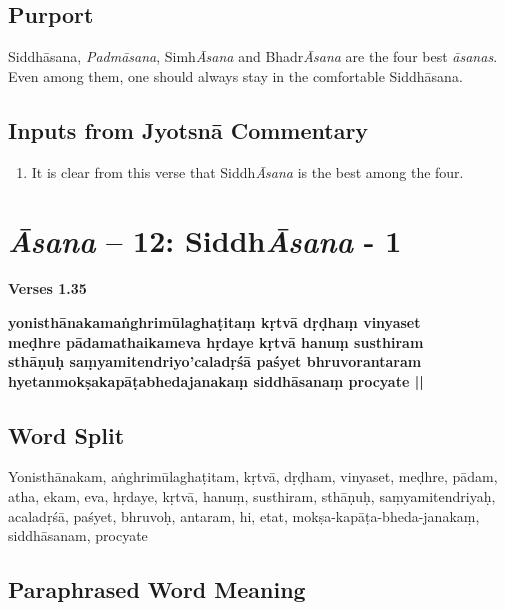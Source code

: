 \subsection*{Purport}

Siddhāsana, \textit{Padmāsana}, Simh\textit{Āsana} and Bhadr\textit{Āsana} are the four best \textit{āsanas}. Even among them, one should always stay in the comfortable Siddhāsana.

\subsection*{Inputs from Jyotsnā Commentary}

\begin{enumerate}
\item It is clear from this verse that Siddh\textit{Āsana} is the best among the four. 
\end{enumerate}

\section*{\textit{Āsana} -- 12: Siddh\textit{Āsana} - 1}

\noindent 
\textbf{Verses 1.35}

\begin{shloka}
\textbf{yonisthānakamaṅghrimūlaghaṭitaṃ kṛtvā dṛḍhaṃ vinyaset}\\
\textbf{meḍhre pādamathaikameva hṛdaye kṛtvā hanuṃ susthiram}\\
\textbf{sthāṇuḥ saṃyamitendriyo'caladṛśā paśyet bhruvorantaram}\\
\textbf{hyetanmokṣakapāṭabhedajanakaṃ siddhāsanaṃ procyate ||}
\end{shloka}

\subsection*{Word Split}

Yonisthānakam, aṅghrimūlaghaṭitam, kṛtvā, dṛḍham, vinyaset, meḍhre, pādam, atha, ekam, eva, hṛdaye, kṛtvā, hanuṃ, susthiram, sthāṇuḥ, saṃyamitendriyaḥ, acaladṛśā, paśyet, bhruvoḥ, antaram, hi, etat, mokṣa-kapāṭa-bheda-janakaṃ, siddhāsanam, procyate

\subsection*{Paraphrased Word Meaning}

